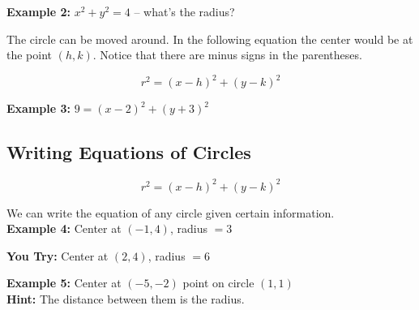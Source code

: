 \documentclass[12pt]{article}
\begin{document}
\textbf{Example 2:} $x^2+y^2=4$ -- what's the radius?

\begin{center}
\end{center}




The circle can be moved around. In the following equation the center would be at the point $(h,k)$. Notice that there are minus signs in the parentheses.

$$r^2=(x-h)^2+(y-k)^2$$

\textbf{Example 3:} $9=(x-2)^2+(y+3)^2$ 

\begin{center}
\end{center}

\pagebreak

\subsection*{Writing Equations of Circles}

$$r^2=(x-h)^2+(y-k)^2$$

We can write the equation of any circle given certain information.\\

\textbf{Example 4:} Center at $(-1,4)$, radius $=3$

\vspace{1in}

\textbf{You Try:} Center at $(2,4)$, radius $=6$

\vspace{1in}

\hrulefill

\textbf{Example 5:} Center at $(-5,-2)$ point on circle $(1,1)$\\
\textbf{Hint:} The distance between them is the radius.\\
\end{document}
